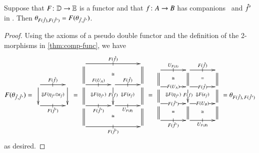 \begin{lem}\label{thm:theta-func}
  Suppose that $F\colon \mathbb{D}\to\mathbb{E}$ is a functor and that $f\colon A\to
  B$ has companions \fhat\ and $\hat{f}'$ in \lD.  Then
  $\theta_{F(\hat{f}),F(\hat{f}')} = F(\theta_{\hat{f},\hat{f}'})$.
\end{lem}
\begin{proof}
  Using the axioms of a pseudo double functor and the definition of
  the 2-morphisms in \autoref{thm:comp-func}, we have
  \begin{equation}
    F(\theta_{\fhat,\fhat'})
    =\;
    \vcenter{\xymatrix@C=3pc{
        \ar[r]|-@{|}^-{F(\fhat)}
        \ar[d] \ar@{}[dr]|{\Downarrow F(\eta_{\hat{f}'} \odot\epsilon_{\hat{f}})} &  \ar[d]\\
        \ar[r]|-@{|}_-{F(\fhat')} &}}
    \;=\;
    \vcenter{\xymatrix@C=3pc{
        \ar[rr]|-@{|}^-{F(\fhat)}
        \ar@{=}[d] \ar@{}[drr]|\iso &&  \ar@{=}[d]\\
        \ar[r]|-@{|}^-{F(U_{A})} \ar@{=}[d]
        \ar@{}[dr]|{\Downarrow F(\eta_{\hat{f}'})} &
        \ar[r]|-@{|}^-{F(\fhat)} \ar[d]|{F(f)}
        \ar@{}[dr]|{\Downarrow F(\epsilon_{\hat{f}})}
        & \ar@{=}[d]\\
        \ar[r]|-@{|}_-{F(\fhat')} \ar@{}[drr]|\iso\ar@{=}[d] &
        \ar[r]|-@{|}_-{U_{F(B)}} & \ar@{=}[d]\\
        \ar[rr]|-@{|}_-{F(\fhat')} && }}
    \;=\;
    \vcenter{\xymatrix@R=1.5pc@C=3pc{
        \ar[r]|-@{|}^-{U_{F(A)}} \ar@{=}[d] \ar@{}[dr]|\iso &
        \ar[r]|-@{|}^-{F(\fhat)} \ar@{=}[d] \ar@{}[dr]|=
        & \ar@{=}[d]\\
        \ar[r]|-{F(U_{A})} \ar@{=}[d] \ar@{}[dr]|{\Downarrow F(\eta_{\hat{f}'})} &
        \ar[r]|-{F(\fhat)} \ar[d]|{F(f)} \ar@{}[dr]|{\Downarrow F(\epsilon_{\hat{f}})}
        & \ar@{=}[d]\\
        \ar[r]|-{F(\fhat')}  \ar@{=}[d] \ar@{}[dr]|= &
        \ar[r]|-{F(U_{B})} \ar@{}[dr]|\iso  \ar@{=}[d] & \ar@{=}[d]\\
        \ar[r]|-@{|}_-{F(\fhat')} &
        \ar[r]|-@{|}_-{U_{F(B)}} &}}
    \;=
    \theta_{F(\fhat),\,F(\fhat')}
  \end{equation}
  as desired.
\end{proof}

